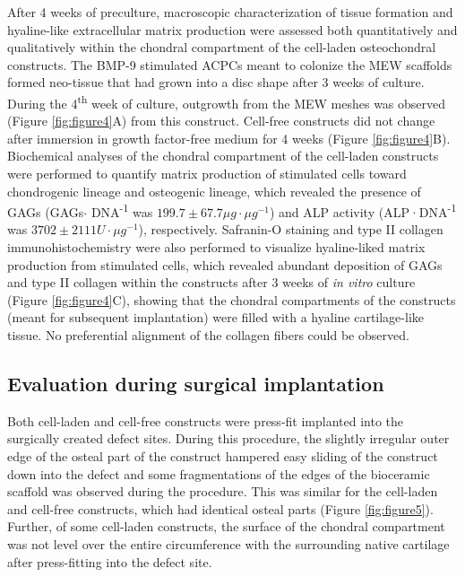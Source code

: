 \documentclass[twocolumn, empirical, authordate, issue]{jote-new-article}
\begin{document}
After 4 weeks of preculture, macroscopic characterization of tissue formation and hyaline-like extracellular matrix production were assessed both quantitatively and qualitatively within the chondral compartment of the cell-laden osteochondral constructs. The BMP-9 stimulated ACPCs meant to colonize the MEW scaffolds formed neo-tissue that had grown into a disc shape after 3 weeks of culture. During the 4\textsuperscript{th} week of culture, outgrowth from the MEW meshes was observed (Figure \ref{fig:figure4}A) from this construct. Cell-free constructs did not change after immersion in growth factor-free medium for 4 weeks (Figure \ref{fig:figure4}B). Biochemical analyses of the chondral compartment of the cell-laden constructs were performed to quantify matrix production of stimulated cells toward chondrogenic lineage and osteogenic lineage, which revealed the presence of GAGs (GAGs$\cdot$ DNA\textsuperscript{-1} was $199.7 \pm 67.7 \mu g\cdot \mu g^{-1}$) and ALP activity (ALP·DNA\textsuperscript{-1} was $3702 \pm 2111 U\cdot\mu g^{-1}$), respectively. Safranin-O staining and type II collagen immunohistochemistry were also performed to visualize hyaline-liked matrix production from stimulated cells, which revealed abundant deposition of GAGs and type II collagen within the constructs after 3 weeks of \emph{in vitro} culture (Figure \ref{fig:figure4}C), showing that the chondral compartments of the constructs (meant for subsequent implantation) were filled with a hyaline cartilage-like tissue. No preferential alignment of the collagen fibers could be observed.



\subsection{Evaluation during surgical implantation} 

Both cell-laden and cell-free constructs were press-fit implanted into the surgically created defect sites. During this procedure, the slightly irregular outer edge of the osteal part of the construct hampered easy sliding of the construct down into the defect and some fragmentations of the edges of the bioceramic scaffold was observed during the procedure. This was similar for the cell-laden and cell-free constructs, which had identical osteal parts (Figure \ref{fig:figure5}). Further, of some cell-laden constructs, the surface of the chondral compartment was not level over the entire circumference with the surrounding native cartilage after press-fitting into the defect site.
\end{document}
